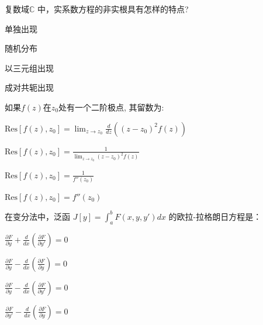 \documentclass{njustexam}
\begin{document}
  



\begin{problem}
复数域$\mathbb{C}$ 中，实系数方程的非实根具有怎样的特点?

  \begin{abcd}
    \item 单独出现
    \item 随机分布
    \item 以三元组出现
    \item 成对共轭出现
  \end{abcd}
\end{problem}


\begin{problem}
  如果$f(z)$在$z_0$处有一个二阶极点, 其留数为:
  \begin{abcd}
    \item $\text{Res}[f(z),  z_0] = \lim_{z \to z_0} \frac{d}{dz} \left( (z - z_0)^2 f(z) \right)$
  \item $\text{Res}[f(z),  z_0] = \frac{1}{\lim_{z \to z_0} (z - z_0)^2 f(z)}$
  \item $\text{Res}[f(z),  z_0] = \frac{1}{f''(z_0)}$
  \item $\text{Res}[f(z),  z_0] = f''(z_0)$
  \end{abcd}
  \end{problem}







\begin{problem}
  在变分法中，泛函 $J[y] = \int_{a}^{b} F(x, y, y') dx$ 的欧拉-拉格朗日方程是：
  \begin{abcd}
  \item $\frac{\partial F}{\partial y} + \frac{d}{dx} \left( \frac{\partial F}{\partial y'} \right) = 0$
  \item $\frac{\partial F}{\partial y} - \frac{d}{dx} \left( \frac{\partial F}{\partial y} \right) = 0$
    \item $\frac{\partial F}{\partial y} - \frac{d}{dx} \left( \frac{\partial F}{\partial y'} \right) = 0$
    \item $\frac{\partial F}{\partial y'} - \frac{d}{dx} \left( \frac{\partial F}{\partial y} \right) = 0$
  \end{abcd}
  \end{problem}
\end{document}
